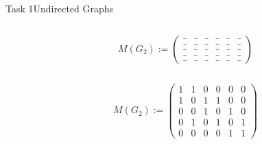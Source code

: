 \begin{frame}[allowframebreaks]{Task 1}{Undirected Graphs}
  \begin{solutionnoinc}
    \begin{columns}
      \begin{column}{0.5\textwidth} 
      \end{column}
      \begin{column}{0.5\textwidth} 
        $M(G_2) :=
        \begin{pmatrix}
          \_ & \_ & \_ & \_ & \_ & \_ \\
          \_ & \_ & \_ & \_ & \_ & \_ \\
          \_ & \_ & \_ & \_ & \_ & \_ \\
          \_ & \_ & \_ & \_ & \_ & \_ \\
          \_ & \_ & \_ & \_ & \_ & \_
        \end{pmatrix}$
      \end{column}
    \end{columns}
  \end{solutionnoinc}
  \begin{solution}
    \begin{columns}
      \begin{column}{0.5\textwidth} 
      \end{column}
      \begin{column}{0.5\textwidth} 
        $M(G_2) :=
        \begin{pmatrix}
          1 & 1 & 0 & 0 & 0 & 0 \\
          1 & 0 & 1 & 1 & 0 & 0 \\
          0 & 0 & 1 & 0 & 1 & 0 \\
          0 & 1 & 0 & 1 & 0 & 1 \\
          0 & 0 & 0 & 0 & 1 & 1
        \end{pmatrix}$
      \end{column}
    \end{columns}
  \end{solution}
\end{frame} 
